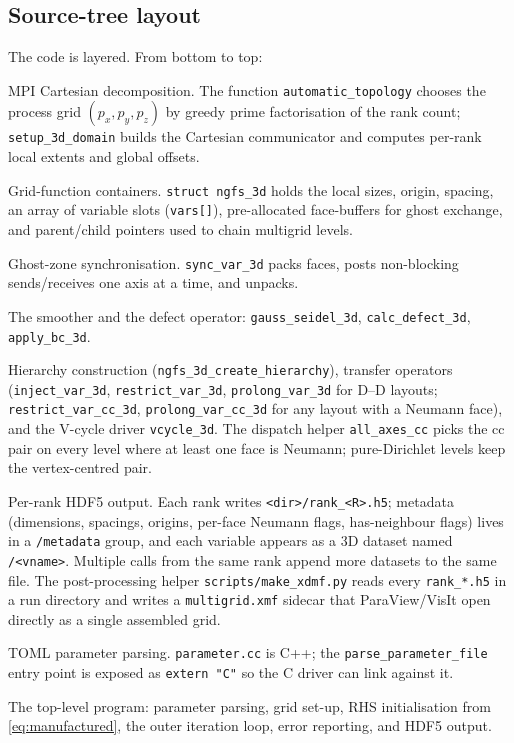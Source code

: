 \documentclass[11pt]{article}
\theoremstyle{definition}
\begin{document}
\subsection{Source-tree layout}
The code is layered.  From bottom to top:
\begin{description}[style=nextline,leftmargin=2em]
\item[\texttt{domain.\{c,h\}}] MPI Cartesian decomposition.  The
  function \texttt{automatic\_topology} chooses the process grid
  $(p_x,p_y,p_z)$ by greedy prime factorisation of the rank count;
  \texttt{setup\_3d\_domain} builds the Cartesian communicator and
  computes per-rank local extents and global offsets.
\item[\texttt{gf.\{c,h\}}] Grid-function containers.  \texttt{struct
  ngfs\_3d} holds the local sizes, origin, spacing, an array of
  variable slots (\texttt{vars[]}), pre-allocated face-buffers for
  ghost exchange, and parent/child pointers used to chain multigrid
  levels.
\item[\texttt{comm.\{c,h\}}] Ghost-zone synchronisation.  \texttt{sync\_var\_3d}
  packs faces, posts non-blocking sends/receives one axis at a time,
  and unpacks.
\item[\texttt{gauss\_seidel.\{c,h\}}] The smoother and the defect
  operator: \texttt{gauss\_seidel\_3d}, \texttt{calc\_defect\_3d},
  \texttt{apply\_bc\_3d}.
\item[\texttt{multigrid.\{c,h\}}] Hierarchy construction
  (\texttt{ngfs\_3d\_create\_hierarchy}), transfer operators
  (\texttt{inject\_var\_3d}, \texttt{restrict\_var\_3d},
  \texttt{prolong\_var\_3d} for D--D layouts;
  \texttt{restrict\_var\_cc\_3d}, \texttt{prolong\_var\_cc\_3d}
  for any layout with a Neumann face), and the V-cycle driver
  \texttt{vcycle\_3d}.  The dispatch helper \texttt{all\_axes\_cc}
  picks the cc pair on every level where at least one face is
  Neumann; pure-Dirichlet levels keep the vertex-centred pair.
\item[\texttt{io.\{c,h\}} and \texttt{HDF5BinaryWrite.\{c,h\}}]
  Per-rank HDF5 output.  Each rank writes
  \texttt{<dir>/rank\_<R>.h5}; metadata (dimensions, spacings,
  origins, per-face Neumann flags, has-neighbour flags) lives in a
  \texttt{/metadata} group, and each variable appears as a 3D dataset
  named \texttt{/<vname>}.  Multiple calls from the same rank append
  more datasets to the same file.  The post-processing helper
  \texttt{scripts/make\_xdmf.py} reads every \texttt{rank\_*.h5} in
  a run directory and writes a \texttt{multigrid.xmf} sidecar that
  ParaView/VisIt open directly as a single assembled grid.
\item[\texttt{parameter.\{cc,h\}} and \texttt{toml.hpp}] TOML parameter
  parsing.  \texttt{parameter.cc} is C++; the
  \texttt{parse\_parameter\_file} entry point is exposed as
  \texttt{extern "C"} so the C driver can link against it.
\item[\texttt{driver\_multigrid.c}] The top-level program: parameter
  parsing, grid set-up, RHS initialisation from
  \eqref{eq:manufactured}, the outer iteration loop, error reporting,
  and HDF5 output.
\end{description}
\end{document}
